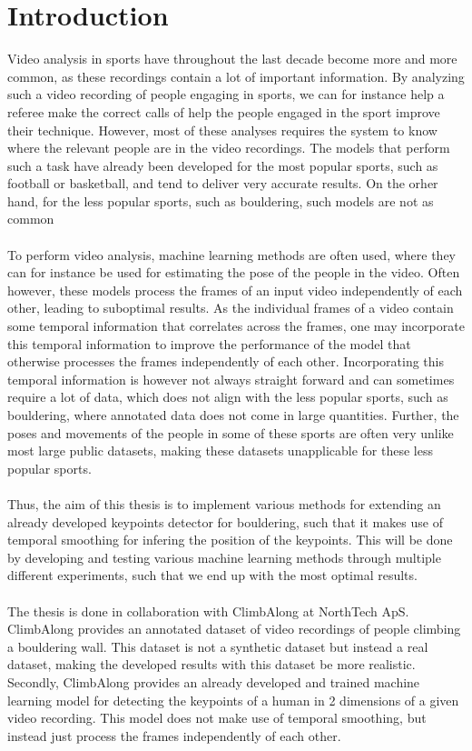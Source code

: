 \documentclass[./main.tex]{subfiles}
\begin{document}
\section{Introduction}
Video analysis in sports have throughout the last decade become more and more common, as these recordings contain a lot of important information. By analyzing such a video recording of people engaging in sports, we can for instance help a referee make the correct calls of help the people engaged in the sport improve their technique. However, most of these analyses requires the system to know where the relevant people are in the video recordings. The models that perform such a task have already been developed for the most popular sports, such as football or basketball, and tend to deliver very accurate results. On the orher hand, for the less popular sports, such as bouldering, such models are not as common
\\
\\
To perform video analysis, machine learning methods are often used, where they can for instance be used for estimating the pose of the people in the video. Often however, these models process the frames of an input video independently of each other, leading to suboptimal results. As the individual frames of a video contain some temporal information that correlates across the frames, one may incorporate this temporal information to improve the performance of the model that otherwise processes the frames independently of each other. Incorporating this temporal information is however not always straight forward and can sometimes require a lot of data, which does not align with the less popular sports, such as bouldering, where annotated data does not come in large quantities. Further, the poses and movements of the people in some of these sports are often very unlike most large public datasets, making these datasets unapplicable for these less popular sports.
\\
\\
Thus, the aim of this thesis is to implement various methods for extending an already developed keypoints detector for bouldering, such that it makes use of temporal smoothing for infering the position of the keypoints. This will be done by developing and testing various machine learning methods through multiple different experiments, such that we end up with the most optimal results.
\\
\\
The thesis is done in collaboration with ClimbAlong at NorthTech ApS. ClimbAlong provides an annotated dataset of video recordings of people climbing a bouldering wall. This dataset is not a synthetic dataset but instead a real dataset, making the developed results with this dataset be more realistic. Secondly, ClimbAlong provides an already developed and trained machine learning model for detecting the keypoints of a human in 2 dimensions of a given video recording. This model does not make use of temporal smoothing, but instead just process the frames independently of each other.
\end{document}
